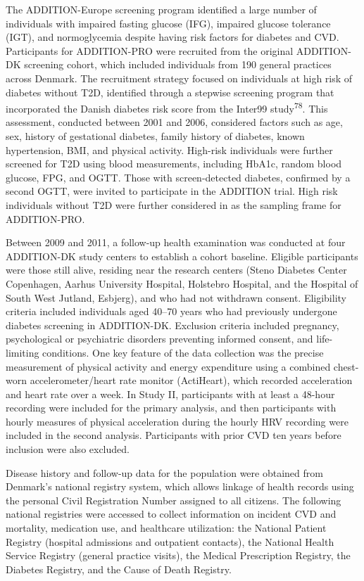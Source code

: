 \documentclass[
  a4paper,
  headsepline=true,
  open=left]{scrbook}
\begin{document}
The ADDITION-Europe screening program identified a large number of
individuals with impaired fasting glucose (IFG), impaired glucose
tolerance (IGT), and normoglycemia despite having risk factors for
diabetes and CVD. Participants for ADDITION-PRO were recruited from the
original ADDITION-DK screening cohort, which included individuals from
190 general practices across Denmark. The recruitment strategy focused
on individuals at high risk of diabetes without T2D, identified through
a stepwise screening program that incorporated the Danish diabetes risk
score from the Inter99 study\textsuperscript{78}. This assessment,
conducted between 2001 and 2006, considered factors such as age, sex,
history of gestational diabetes, family history of diabetes, known
hypertension, BMI, and physical activity. High-risk individuals were
further screened for T2D using blood measurements, including HbA1c,
random blood glucose, FPG, and OGTT. Those with screen-detected
diabetes, confirmed by a second OGTT, were invited to participate in the
ADDITION trial. High risk individuals without T2D were further
considered in as the sampling frame for ADDITION-PRO.

Between 2009 and 2011, a follow-up health examination was conducted at
four ADDITION-DK study centers to establish a cohort baseline. Eligible
participants were those still alive, residing near the research centers
(Steno Diabetes Center Copenhagen, Aarhus University Hospital, Holstebro
Hospital, and the Hospital of South West Jutland, Esbjerg), and who had
not withdrawn consent. Eligibility criteria included individuals aged
40--70 years who had previously undergone diabetes screening in
ADDITION-DK. Exclusion criteria included pregnancy, psychological or
psychiatric disorders preventing informed consent, and life-limiting
conditions. One key feature of the data collection was the precise
measurement of physical activity and energy expenditure using a combined
chest-worn accelerometer/heart rate monitor (ActiHeart), which recorded
acceleration and heart rate over a week. In Study II, participants with
at least a 48-hour recording were included for the primary analysis, and
then participants with hourly measures of physical acceleration during
the hourly HRV recording were included in the second analysis.
Participants with prior CVD ten years before inclusion were also
excluded.

Disease history and follow-up data for the population were obtained from
Denmark's national registry system, which allows linkage of health
records using the personal Civil Registration Number assigned to all
citizens. The following national registries were accessed to collect
information on incident CVD and mortality, medication use, and
healthcare utilization: the National Patient Registry (hospital
admissions and outpatient contacts), the National Health Service
Registry (general practice visits), the Medical Prescription Registry,
the Diabetes Registry, and the Cause of Death Registry.
\end{document}
